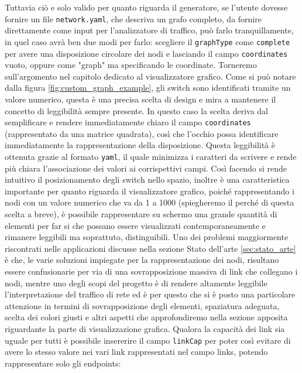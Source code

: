 \documentclass[binding=0.6cm]{sapthesis}
\begin{document}
Tuttavia ciò e solo valido per quanto riguarda il generatore, se l'utente dovesse fornire un file \texttt{network.yaml}, che descriva un grafo completo,
da fornire direttamente come input per l'analizzatore di traffico, può farlo tranquillamente, in quel caso avrà ben due modi per farlo:
scegliere il \texttt{graphType} come \texttt{complete} per avere una disposizione circolare dei nodi e lasciando il campo \texttt{coordinates} vuoto, oppure come "graph" ma
specificando le coordinate. Torneremo sull'argomento nel capitolo dedicato al visualizzatore grafico.
Come si può notare dalla figura \ref{fig:custom_graph_example}, gli switch sono identificati tramite un valore numerico, 
questa è una precisa scelta di design e mira a mantenere il concetto di leggibilità sempre
presente. In questo caso la scelta deriva dal semplificare e rendere immediatamente chiaro il campo \texttt{coordinates} 
(rappresentato da una matrice quadrata), così che l'occhio possa identificare immediatamente la rappresentazione della disposizione. Questa leggibilità è ottenuta
grazie al formato \texttt{yaml}, il quale minimizza i caratteri da scrivere e rende più chiara l'associazione dei valori ai corrispettivi campi.
Così facendo si rende intuitivo il posizionamento degli switch nello spazio, inoltre è una caratteristica importante per quanto riguarda il
visualizzatore grafico, poiché rappresentando i nodi con un valore numerico che va da 1 a 1000 (spiegheremo il perché di questa scelta a breve), è 
possibile rappresentare su schermo una grande quantità di elementi per far si che possano essere visualizzati contemporaneamente e rimanere leggibili ma soprattuto,
 distinguibili. Uno dei problemi maggiormente riscontrati nelle applicazioni discusse nella sezione Stato dell'arte \ref{sec:stato_arte} è che, le varie soluzioni impiegate
 per la rappresentazione dei nodi, risultano essere confusionarie per via di una sovrapposizione massiva di link che collegano i nodi, mentre uno degli scopi del
 progetto è di rendere altamente leggibile l'interpretazione del traffico di rete ed è per questo che si è posto una particolare attenzione in termini di
 sovrapposizione degli elementi, spaziatura adeguata, scelta dei colori giusti e altri aspetti che approfondiremo nella sezione apposita riguardante la parte
 di visualizzazione grafica.
Qualora la capacità dei link sia uguale per tutti è possibile insererire il campo 
\texttt{linkCap} per poter così evitare di avere lo stesso valore nei vari link rappresentati nel campo links, potendo rappresentare solo gli endpoints:
\end{document}
